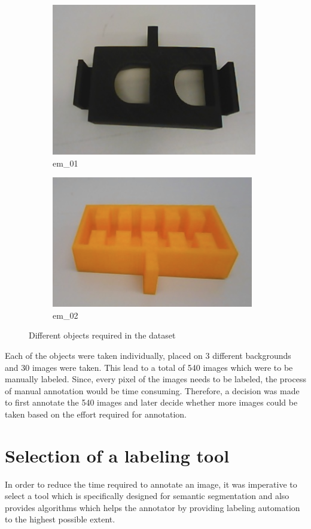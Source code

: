 \begin{figure}
		\begin{subfigure}{.3\textwidth}
  			\centering
  			\includegraphics[width=.5\linewidth]{images/em_01}
  			\caption{em\_01}
  			\label{fig:em_01}
		\end{subfigure}
		\begin{subfigure}{.3\textwidth}
  			\centering
  			\includegraphics[width=.5\linewidth]{images/em_02}
  			\caption{em\_02}
  			\label{fig:em_02}
		\end{subfigure}
		\caption{Different objects required in the dataset}
		\label{Fig:objects}
	\end{figure}

Each of the objects were taken individually, placed on 3 different backgrounds and 30 images were taken. This lead to a total of 540 images which were to be manually labeled. Since, every pixel of the images needs to be labeled, the process of manual annotation would be time consuming. Therefore, a decision was made to first annotate the 540 images and later decide whether more images could be taken based on the effort required for annotation.

\section{Selection of a labeling tool}
In order to reduce the time required to annotate an image, it was imperative to select a tool which is specifically designed for semantic segmentation and also provides algorithms which helps the annotator by providing labeling automation to the highest possible extent.

